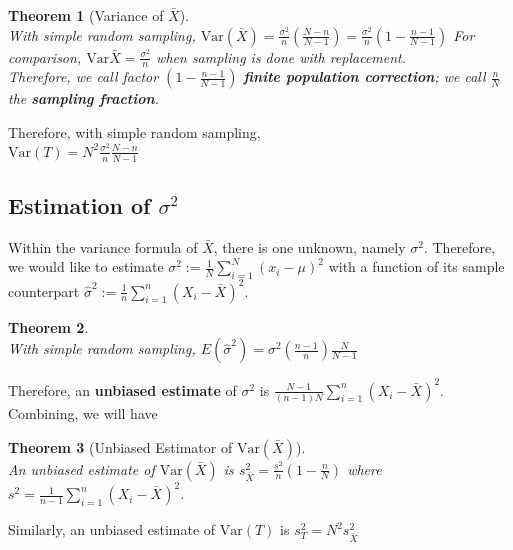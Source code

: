 \documentclass[12pt]{article}
\newcommand{\var}{\mathrm{Var}}
\newtheorem{theorem}{Theorem}[section]
\theoremstyle{definition}
\begin{document}
\begin{theorem}[Variance of {$\bar{X}$}]
\hfill\\\normalfont With simple random sampling,
$
\var(\bar{X}) = \frac{\sigma^2}{n}(\frac{N-n}{N-1}) = \frac{\sigma^2}{n}(1-\frac{n-1}{N-1})
$
For comparison, $\var{\bar{X}} = \frac{\sigma^2}{n}$ when sampling is done \textit{with} replacement.\\
Therefore, we call factor $(1-\frac{n-1}{N-1})$ \textbf{finite population correction}; we call $\frac{n}{N}$ the \textbf{sampling fraction}.
\end{theorem}
Therefore, with simple random sampling,\\
$
\var(T) = N^2\frac{\sigma^2}{n}\frac{N-n}{N-1}
$
\subsection{Estimation of {$\sigma^2$}}
Within the variance formula of $\bar{X}$, there is one unknown, namely $\sigma^2$. Therefore, we would like to estimate $\sigma^2:=\frac{1}{N} \sum_{i=1}^N (x_i-\mu)^2$ with a function of its sample counterpart $\hat{\sigma}^2:=\frac{1}{n}\sum_{i=1}^n (X_i-\bar{X})^2$.
\begin{theorem}
\hfill\\\normalfont With simple random sampling, 
$
E(\hat{\sigma}^2) = \sigma^2(\frac{n-1}{n})\frac{N}{N-1}
$
\end{theorem}
Therefore, an \textbf{unbiased estimate} of $\sigma^2$ is $\frac{N-1}{(n-1)N}\sum_{i=1}^n (X_i-\bar{X})^2$.\\

Combining, we will have
\begin{theorem}[Unbiased Estimator of {$\var(\bar{X})$}]
\hfill\\\normalfont An unbiased estimate of $\var(\bar{X})$ is
$
s_{\bar{X}}^2 = \frac{s^2}{n}(1-\frac{n}{N})
$
where $s^2 = \frac{1}{n-1}\sum_{i=1}^n (X_i-\bar{X})^2$.
\end{theorem}
Similarly, an unbiased estimate of $\var(T)$ is
$
s_T^2 = N^2 s^2_{\bar{X}}
$
\end{document}
